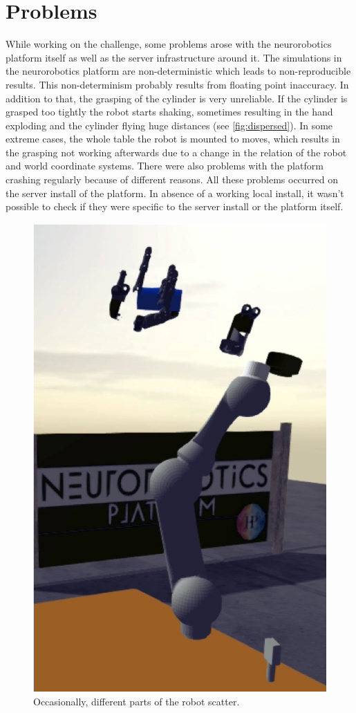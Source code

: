\section{Problems}\label{sec:problems}
While working on the challenge, some problems arose with the neurorobotics platform itself as well as the server infrastructure around it.
The simulations in the neurorobotics platform are non-deterministic which leads to non-reproducible results.
This non-determinism probably results from floating point inaccuracy.
In addition to that, the grasping of the cylinder is very unreliable.
If the cylinder is grasped too tightly the robot starts shaking, sometimes resulting in the hand exploding and the cylinder flying huge distances (see \autoref{fig:dispersed}).
In some extreme cases, the whole table the robot is mounted to moves, which results in the grasping not working afterwards due to a change in the relation of the robot and world coordinate systems.
There were also problems with the platform crashing regularly because of different reasons.
All these problems occurred on the server install of the platform.
In absence of a working local install, it wasn't possible to check if they were specific to the server install or the platform itself.

\begin{figure}[h]
\centering
\includegraphics[width=.95\columnwidth]{figures/dispersed_robot.png}
\caption{Occasionally, different parts of the robot scatter.}
\label{fig:dispersed}
\end{figure}